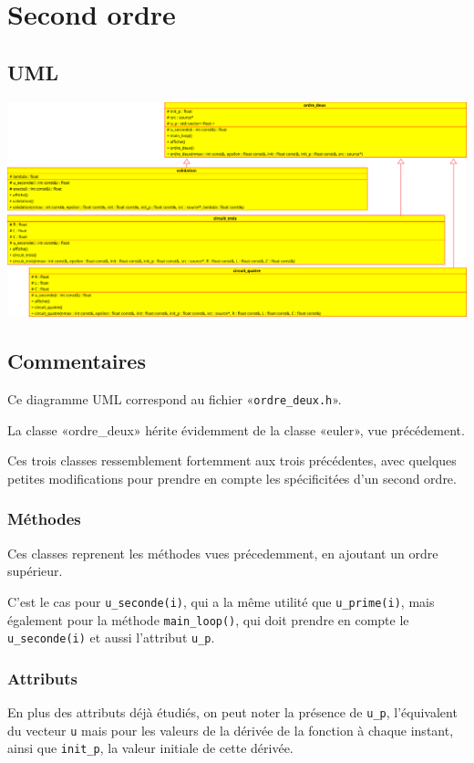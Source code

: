 \documentclass{report}
\begin{document}
\chapter{Second ordre}
    \begin{multicols}{2}
        \section{UML}
            \includegraphics[width=\linewidth+\linewidth,angle=90]{images/ordre_deux}

        \section{Commentaires}
            Ce diagramme UML correspond au fichier «\verb|ordre_deux.h|».

            La classe «ordre\_deux» hérite évidemment de la classe «euler», vue précédement.

            Ces trois classes ressemblement fortemment aux trois précédentes, avec quelques petites modifications
            pour prendre en compte les spécificitées d’un second ordre.

            \subsection{Méthodes}
            Ces classes reprenent les méthodes vues précedemment, en ajoutant un ordre supérieur.

            C’est le cas pour \verb|u_seconde(i)|, qui a la même utilité que \verb|u_prime(i)|, mais également
            pour la méthode \verb|main_loop()|, qui doit prendre en compte le \verb|u_seconde(i)| et aussi
            l’attribut \verb|u_p|.

            \subsection{Attributs}
            En plus des attributs déjà étudiés, on peut noter la présence de \verb|u_p|, l’équivalent du vecteur
            \verb|u| mais pour les valeurs de la dérivée de la fonction à chaque instant, ainsi que \verb|init_p|,
            la valeur initiale de cette dérivée.
    \end{multicols}
\end{document}
